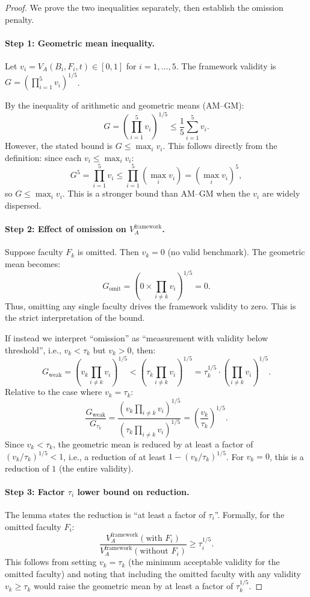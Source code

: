\begin{proof}
We prove the two inequalities separately, then establish the omission
penalty.

\paragraph{Step 1: Geometric mean inequality.}
Let $v_i = V_A(B_i, F_i, t) \in [0, 1]$ for $i = 1, \dots, 5$. The
framework validity is $G = (\prod_{i=1}^5 v_i)^{1/5}$.

By the inequality of arithmetic and geometric means (AM--GM):
\[
G = \left(\prod_{i=1}^5 v_i\right)^{1/5} \leq \frac{1}{5}\sum_{i=1}^5 v_i.
\]
However, the stated bound is $G \leq \max_i v_i$. This follows directly
from the definition: since each $v_i \leq \max_i v_i$:
\[
G^5 = \prod_{i=1}^5 v_i \leq \prod_{i=1}^5 (\max_i v_i) = (\max_i v_i)^5,
\]
so $G \leq \max_i v_i$. This is a stronger bound than AM--GM when the
$v_i$ are widely dispersed.

\paragraph{Step 2: Effect of omission on $V_A^{\text{framework}}$.}
Suppose faculty $F_k$ is omitted. Then $v_k = 0$ (no valid benchmark).
The geometric mean becomes:
\[
G_{\text{omit}} = \left(0 \times \prod_{i \neq k} v_i\right)^{1/5} = 0.
\]
Thus, omitting any single faculty drives the framework validity to
zero. This is the strict interpretation of the bound.

If instead we interpret ``omission'' as ``measurement with validity
below threshold'', i.e., $v_k < \tau_k$ but $v_k > 0$, then:
\[
G_{\text{weak}} = \left(v_k \prod_{i \neq k} v_i\right)^{1/5}
< \left(\tau_k \prod_{i \neq k} v_i\right)^{1/5}
= \tau_k^{1/5} \cdot \left(\prod_{i \neq k} v_i\right)^{1/5}.
\]
Relative to the case where $v_k = \tau_k$:
\[
\frac{G_{\text{weak}}}{G_{\tau_k}}
= \frac{(v_k \prod_{i \neq k} v_i)^{1/5}}{(\tau_k \prod_{i \neq k} v_i)^{1/5}}
= \left(\frac{v_k}{\tau_k}\right)^{1/5}.
\]
Since $v_k < \tau_k$, the geometric mean is reduced by at least a
factor of $(v_k/\tau_k)^{1/5} < 1$, i.e., a reduction of at least
$1 - (v_k/\tau_k)^{1/5}$. For $v_k = 0$, this is a reduction of $1$
(the entire validity).

\paragraph{Step 3: Factor $\tau_i$ lower bound on reduction.}
The lemma states the reduction is ``at least a factor of $\tau_i$''.
Formally, for the omitted faculty $F_i$:
\[
\frac{V_A^{\text{framework}}(\text{with } F_i)}{V_A^{\text{framework}}(\text{without } F_i)}
\geq \tau_i^{1/5}.
\]
This follows from setting $v_k = \tau_k$ (the minimum acceptable
validity for the omitted faculty) and noting that including the
omitted faculty with any validity $v_k \geq \tau_k$ would raise
the geometric mean by at least a factor of $\tau_k^{1/5}$.


\end{proof}
